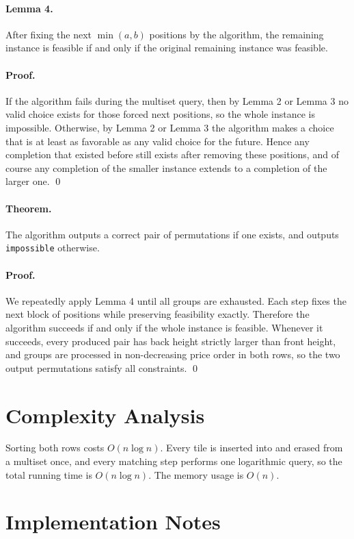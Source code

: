 \documentclass[11pt]{article}
\begin{document}
\paragraph{Lemma 4.}
After fixing the next $\min(a,b)$ positions by the algorithm, the remaining instance is feasible if and only if the original remaining instance was feasible.

\paragraph{Proof.}
If the algorithm fails during the multiset query, then by Lemma 2 or Lemma 3 no valid choice exists for those forced next positions, so the whole instance is impossible. Otherwise, by Lemma 2 or Lemma 3 the algorithm makes a choice that is at least as favorable as any valid choice for the future. Hence any completion that existed before still exists after removing these positions, and of course any completion of the smaller instance extends to a completion of the larger one. \qed

\paragraph{Theorem.}
The algorithm outputs a correct pair of permutations if one exists, and outputs \texttt{impossible} otherwise.

\paragraph{Proof.}
We repeatedly apply Lemma 4 until all groups are exhausted. Each step fixes the next block of positions while preserving feasibility exactly. Therefore the algorithm succeeds if and only if the whole instance is feasible. Whenever it succeeds, every produced pair has back height strictly larger than front height, and groups are processed in non-decreasing price order in both rows, so the two output permutations satisfy all constraints. \qed

\section*{Complexity Analysis}

Sorting both rows costs $O(n \log n)$. Every tile is inserted into and erased from a multiset once, and every matching step performs one logarithmic query, so the total running time is $O(n \log n)$. The memory usage is $O(n)$.

\section*{Implementation Notes}
\end{document}
